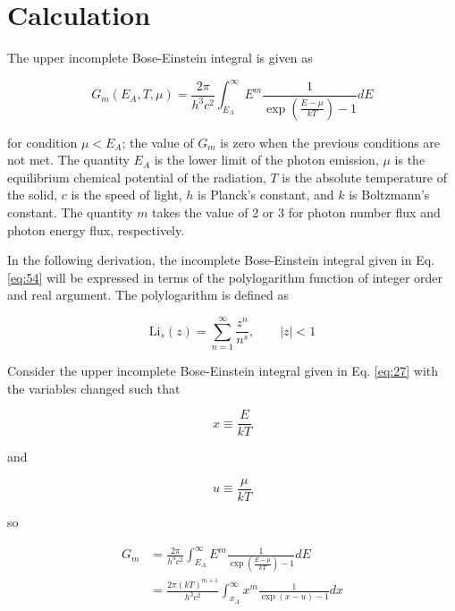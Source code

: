 \documentclass[aip,jap,reprint]{revtex4-1}
\newcommand{\Li}{\textrm{Li}}
\begin{document}
\section{Calculation}
The upper incomplete Bose-Einstein integral is given as

\begin{equation} \label{eq:54}
G_{m}(E_{A},T,\mu) = \frac{2 \pi}{h^{3}c^{2}} \int_{E_{A}}^{\infty} E^{m} \frac{1}{\exp \left( \frac{E - \mu}{kT} \right) - 1} dE 
\end{equation}

\noindent for condition $\mu < E_{A}$; the value of $G_{m}$ is zero when the previous conditions are not met. The quantity $E_{A}$ is the lower limit of the photon emission, $\mu$ is the equilibrium chemical potential of the radiation, $T$ is the absolute temperature of the solid, $c$ is the speed of light, $h$ is Planck's constant, and $k$ is Boltzmann's constant. The quantity $m$ takes the value of 2 or 3 for photon number flux and photon energy flux, respectively.

In the following derivation, the incomplete Bose-Einstein integral given in Eq. \ref{eq:54} will be expressed in terms of the polylogarithm function of integer order and real argument. The polylogarithm is defined as

\begin{equation} \label{eq:22}
\Li_{s}(z) = \sum_{n = 1}^{\infty} \frac{z^{n}}{n^{s}}, \qquad |z| < 1
\end{equation}

Consider the upper incomplete Bose-Einstein integral given in Eq. \ref{eq:27} with the variables changed such that

\begin{equation} \label{eq:28}
x \equiv \frac{E}{kT}
\end{equation}

\noindent and

\begin{equation} \label{eq:29}
u \equiv \frac{\mu}{kT}
\end{equation}

\noindent so

\begin{align} \label{eq:27}
G_{m} &= \frac{2 \pi}{h^{3}c^{2}} \int_{E_{A}}^{\infty} E^{m} \frac{1}{\exp \left( \frac{E - \mu}{kT} \right) - 1} dE \nonumber \\
 &= \frac{2 \pi (kT)^{m+1}}{h^{3}c^{2}} \int_{x_{A}}^{\infty} x^{m} \frac{1}{\exp(x-u) - 1} dx
\end{align}
\end{document}
